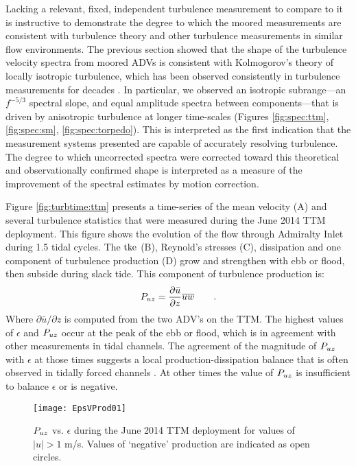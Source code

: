 Lacking a relevant, fixed, independent turbulence measurement to compare to it is instructive to demonstrate the degree to which the moored measurements are consistent with turbulence theory and other turbulence measurements in similar flow environments. The previous section showed that the shape of the turbulence velocity spectra from moored ADVs is consistent with Kolmogorov's theory of locally isotropic turbulence, which has been observed consistently in turbulence measurements for decades \cite[]{Kolmogorov1941c,Grant++1962,McMillan++2016}. In particular, we observed an isotropic subrange---an $f^{-5/3}$ spectral slope, and equal amplitude spectra between components---that is driven by anisotropic turbulence at longer time-scales (Figures \ref{fig:spec:ttm}, \ref{fig:spec:sm}, \ref{fig:spec:torpedo}). This is interpreted as the first indication that the measurement systems presented are capable of accurately resolving turbulence. The degree to which uncorrected spectra were corrected toward this theoretical and observationally confirmed shape is interpreted as a measure of the improvement of the spectral estimates by motion correction.

Figure \ref{fig:turbtime:ttm} presents a time-series of the mean velocity (A) and several turbulence statistics that were measured during the June 2014 TTM deployment. This figure shows the evolution of the flow through Admiralty Inlet during 1.5 tidal cycles. The $\mathrm{tke}$ (B), Reynold's stresses (C), dissipation and one component of turbulence production (D) grow and strengthen with ebb or flood, then subside during slack tide.  This component of turbulence production is:
\begin{align}
  P_{uz} = \frac{\partial \bar{u}}{\partial z}\overline{uw} \qquad .
\end{align}
Where $\partial \bar{u}/\partial z$ is computed from the two ADV's on the TTM. The highest values of $\epsilon$ and $P_{uz}$ occur at the peak of the ebb or flood, which is in agreement with other measurements in tidal channels. The agreement of the magnitude of $P_{uz}$ with $\epsilon$ at those times suggests a local production-dissipation balance that is often observed in tidally forced channels \cite[]{Trowbridge++1999,Stacey++1999,McMillan++2016}. At other times the value of $P_{uz}$ is insufficient to balance $\epsilon$ or is negative. 

\begin{figure}[t]
  \centering
  \texttt{[image: EpsVProd01]}
  \caption{$P_{uz}$ vs. $\epsilon$ during the June 2014 TTM deployment for values of $|u|>1$ m/s. Values of `negative' production are indicated as open circles. }
  \label{fig:prodVeps}
\end{figure}

